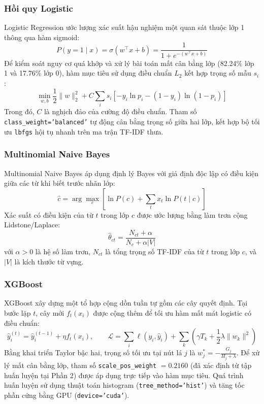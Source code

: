 \subsubsection{Hồi quy Logistic}
Logistic Regression ước lượng xác suất hậu nghiệm một quan sát thuộc lớp 1 thông qua hàm sigmoid:
\begin{equation}
P(y = 1 \mid x) = \sigma(w^\top x + b) = \frac{1}{1 + e^{-(w^\top x + b)}}
\end{equation}
Để kiểm soát nguy cơ quá khớp và xử lý bài toán mất cân bằng lớp (82.24\% lớp 1 và 17.76\% lớp 0), hàm mục tiêu sử dụng điều chuẩn $L_2$ kết hợp trọng số mẫu $s_i$:
\begin{equation}
\min_{w, b} \frac{1}{2} \|w\|_2^2 + C \sum_i s_i \left[-y_i \ln p_i - (1 - y_i) \ln(1 - p_i)\right]
\end{equation}
Trong đó, $C$ là nghịch đảo của cường độ điều chuẩn. Tham số \texttt{class\_weight='balanced'} tự động cân bằng trọng số giữa hai lớp, kết hợp bộ tối ưu \texttt{lbfgs} hội tụ nhanh trên ma trận TF-IDF thưa.

\subsubsection{Multinomial Naive Bayes}
Multinomial Naive Bayes áp dụng định lý Bayes với giả định độc lập có điều kiện giữa các từ khi biết trước nhãn lớp:
\begin{equation}
\hat{c} = \arg\max_c \left[ \ln P(c) + \sum_t x_t \ln P(t \mid c) \right]
\end{equation}
Xác suất có điều kiện của từ $t$ trong lớp $c$ được ước lượng bằng làm trơn cộng Lidstone/Laplace:
\begin{equation}
\hat{\theta}_{ct} = \frac{N_{ct} + \alpha}{N_c + \alpha |V|}
\end{equation}
với $\alpha > 0$ là hệ số làm trơn, $N_{ct}$ là tổng trọng số TF-IDF của từ $t$ trong lớp $c$, và $|V|$ là kích thước từ vựng.

\subsubsection{XGBoost}
XGBoost \cite{chen2016} xây dựng một tổ hợp cộng dồn tuần tự gồm các cây quyết định. Tại bước lặp $t$, cây mới $f_t(x_i)$ được cộng thêm để tối ưu hàm mất mát logistic có điều chuẩn:
\begin{equation}
\hat{y}_i^{(t)} = \hat{y}_i^{(t-1)} + \eta f_t(x_i), \qquad \mathcal{L} = \sum_i \ell(y_i, \hat{y}_i) + \sum_k \left(\gamma T_k + \frac{1}{2} \lambda \|w_k\|^2\right)
\end{equation}
Bằng khai triển Taylor bậc hai, trọng số tối ưu tại nút lá $j$ là $w_j^* = -\frac{G_j}{H_j + \lambda}$. Để xử lý mất cân bằng lớp, tham số \texttt{scale\_pos\_weight} $= 0.2160$ (đã xác định từ tập huấn luyện tại Phần 2) được áp dụng trực tiếp vào hàm mục tiêu. Quá trình huấn luyện sử dụng thuật toán histogram (\texttt{tree\_method=\allowbreak'hist'}) và tăng tốc phần cứng bằng GPU (\texttt{device=\allowbreak'cuda'}).

